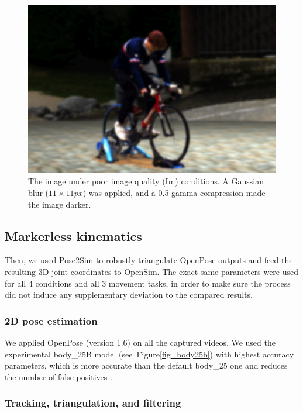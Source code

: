 \begin{figure}[!ht]
	\centering
	\def\svgwidth{1\columnwidth}
	\fontsize{10pt}{10pt}\selectfont
	\includegraphics[width=\linewidth]{"../Chap4/Figures/Fig_ImQuality.png"}
	\caption{The image under poor image quality (Im) conditions. A Gaussian blur (\(11 \times 11 px\)) was applied, and a 0.5 gamma compression made the image darker.}
	\label{fig_imquality}
\end{figure}


\subsection{Markerless kinematics}

Then, we used Pose2Sim to robustly triangulate OpenPose outputs and feed the resulting 3D joint coordinates to OpenSim. The exact same parameters were used for all 4 conditions and all 3 movement tasks, in order to make sure the process did not induce any supplementary deviation to the compared results.

\subsubsection{2D pose estimation}

We applied OpenPose (version 1.6) on all the captured videos. We used the experimental body\_25B model (see~Figure\ref{fig_body25b}) with highest accuracy parameters, which is more accurate than the default body\_25 one and reduces the number of false positives \cite{Hidalgo2019}.

\subsubsection{Tracking, triangulation, and filtering}

